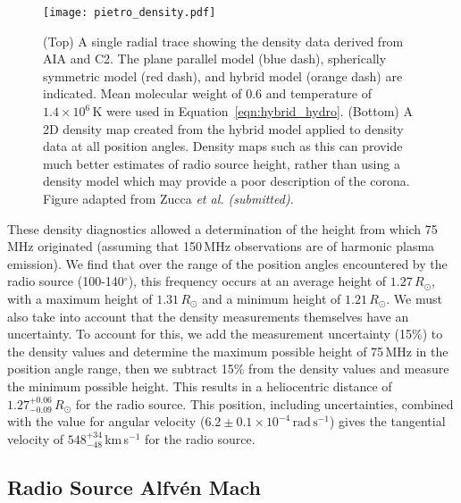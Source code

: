 \begin{figure}[t!]
\begin{center}
\texttt{[image: pietro\_density.pdf]}
\caption[2D density map of the corona]{(Top) A single radial trace showing the density data derived from AIA and C2. The plane parallel model (blue dash), spherically symmetric model (red dash), and hybrid model (orange dash) are indicated. Mean molecular weight of 0.6 and temperature of $1.4\times10^{6}$\,K were used in Equation~\ref{eqn:hybrid_hydro}. (Bottom) A 2D density map created from the hybrid model applied to density data at all position angles.
Density maps such as this can provide much better estimates of radio source height, rather than using a density model which may provide a poor description of the corona. Figure adapted from Zucca \it{et al.} (submitted).}
\label{fig:density_map}
\end{center}
\end{figure}

These density diagnostics allowed a determination of the height from which 75\,MHz originated (assuming that 150\,MHz observations are of harmonic plasma emission). We find that over the range of the position angles encountered by the radio source (100-140$^{\circ}$), this frequency occurs at an average height of $1.27\,R_{\odot}$, with a maximum height of $1.31\,R_{\odot}$ and a minimum height of $1.21\,R_{\odot}$. We must also take into account that the density measurements themselves have an uncertainty. To account for this, we add the measurement uncertainty (15\%) to the density values and determine the maximum possible height of 75\,MHz in the position angle range, then we subtract 15\% from the density values and measure the minimum possible height. This results in a heliocentric distance of $1.27^{+0.06}_{-0.09}\,R_{\odot}$ for the radio source. This position, including uncertainties, combined with the value for angular velocity ($6.2\pm0.1\times10^{-4}\,\mathrm{rad\,s^{-1}} $) gives the tangential velocity of $548^{+34}_{-48}$\,km\,s$^{-1}$ for the radio source.


\subsection{Radio Source Alfv\'{e}n Mach}

